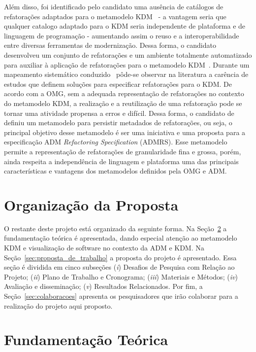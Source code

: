 \documentclass[12pt]{article}
\begin{document}
Além disso, foi identificado pelo candidato uma ausência de catálogos de refatorações adaptados para o metamodelo KDM~\cite{durelli_systematic_mapping} - a vantagem seria que qualquer catalogo adaptado para o KDM seria independente de plataforma e de linguagem de programação - aumentando assim o reuso e a interoperabilidade entre diversas ferramentas de modernização. Dessa forma, o candidato desenvolveu um conjunto de refatorações e um ambiente totalmente automatizado para auxiliar à aplicação de refatorações para o metamodelo KDM~\cite{durelli_catalogo, durelli_VEM_ferramenta}. Durante um mapeamento sistemático conduzido~\cite{durelli_systematic_mapping} pôde-se observar na literatura a carência de estudos que definem soluções para especificar refatorações para o KDM. De acordo com a OMG, sem a adequada representação de refatorações no contexto do metamodelo KDM, a realização e a reutilização de uma refatoração pode se tornar uma atividade propensa a erros e difícil. Dessa forma, o candidato de definiu um metamodelo para persistir metadados de refatorações, ou seja, o principal objetivo desse metamodelo é ser uma iniciativa e uma proposta para a especificação ADM \textit{Refactoring Specification} (ADMRS). Esse metamodelo permite a representação de refatorações de granularidade fina e grossa, porém, ainda respeita a independência de linguagem e plataforma uma das principais características e vantagens dos metamodelos definidos pela OMG e ADM. 

\section{Organização da Proposta}

O restante deste projeto está organizado da seguinte forma. Na Seção~\ref{sec:fundamentacao_teorica} a fundamentação teórica é apresentada, dando especial atenção ao metamodelo KDM e visualização de software no contexto da ADM e KDM. Na Seção~\ref{sec:proposta_de_trabalho} a proposta do projeto é apresentado. Essa seção é dividida em cinco subseções (\textit{i}) Desafios de Pesquisa com Relação ao Projeto; (\textit{ii}) Plano de Trabalho e Cronograma; (\textit{iii}) Materiais e Métodos; (\textit{iv}) Avaliação e disseminação; (\textit{v}) Resultados Relacionados. Por fim, a Seção~\ref{sec:colaboracoes} apresenta os pesquisadores que irão colaborar para a realização do projeto aqui proposto.

\section{Fundamentação Teórica}\label{sec:fundamentacao_teorica}
\end{document}
